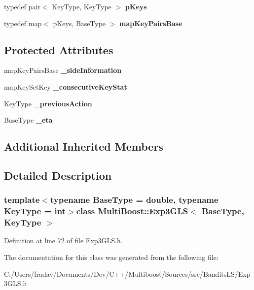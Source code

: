 \begin{DoxyCompactItemize}
\item 
\hypertarget{classMultiBoost_1_1Exp3GLS_a4b58cc485c723fdde823e5a81e932962}{typedef pair$<$ Key\-Type, Key\-Type $>$ {\bfseries p\-Keys}}\label{classMultiBoost_1_1Exp3GLS_a4b58cc485c723fdde823e5a81e932962}

\item 
\hypertarget{classMultiBoost_1_1Exp3GLS_a3b04960b489fa6429038fea8c57d50a8}{typedef map$<$ p\-Keys, Base\-Type $>$ {\bfseries map\-Key\-Pairs\-Base}}\label{classMultiBoost_1_1Exp3GLS_a3b04960b489fa6429038fea8c57d50a8}

\end{DoxyCompactItemize}
\subsection*{Protected Attributes}
\begin{DoxyCompactItemize}
\item 
\hypertarget{classMultiBoost_1_1Exp3GLS_a9d12aedf8a8b1ab337f8a6b4b62efcf9}{map\-Key\-Pairs\-Base {\bfseries \-\_\-side\-Information}}\label{classMultiBoost_1_1Exp3GLS_a9d12aedf8a8b1ab337f8a6b4b62efcf9}

\item 
\hypertarget{classMultiBoost_1_1Exp3GLS_a00ccd3d395374af918cf2677d8280804}{map\-Key\-Set\-Key {\bfseries \-\_\-consecutive\-Key\-Stat}}\label{classMultiBoost_1_1Exp3GLS_a00ccd3d395374af918cf2677d8280804}

\item 
\hypertarget{classMultiBoost_1_1Exp3GLS_ab75d596d8de4ac353f216e94fabd1ae4}{Key\-Type {\bfseries \-\_\-previous\-Action}}\label{classMultiBoost_1_1Exp3GLS_ab75d596d8de4ac353f216e94fabd1ae4}

\item 
\hypertarget{classMultiBoost_1_1Exp3GLS_ae25e36921abf3dafe024fa49577c98b7}{Base\-Type {\bfseries \-\_\-eta}}\label{classMultiBoost_1_1Exp3GLS_ae25e36921abf3dafe024fa49577c98b7}

\end{DoxyCompactItemize}
\subsection*{Additional Inherited Members}


\subsection{Detailed Description}
\subsubsection*{template$<$typename Base\-Type = double, typename Key\-Type = int$>$class Multi\-Boost\-::\-Exp3\-G\-L\-S$<$ Base\-Type, Key\-Type $>$}



Definition at line 72 of file Exp3\-G\-L\-S.\-h.



The documentation for this class was generated from the following file\-:\begin{DoxyCompactItemize}
\item 
C\-:/\-Users/fradav/\-Documents/\-Dev/\-C++/\-Multiboost/\-Sources/src/\-Bandits\-L\-S/Exp3\-G\-L\-S.\-h\end{DoxyCompactItemize}
